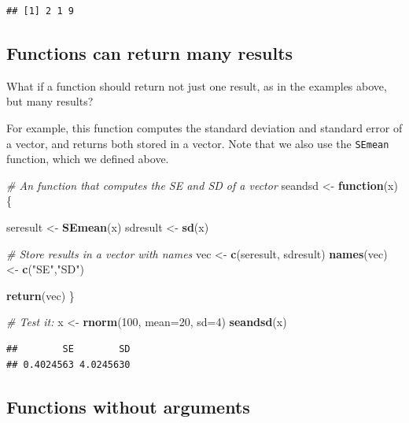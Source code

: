 \documentclass[]{book}
\newenvironment{Shaded}{\begin{snugshade}}{\end{snugshade}}
\newcommand{\CommentTok}[1]{\textcolor[rgb]{0.56,0.35,0.01}{\textit{#1}}}
\newcommand{\ControlFlowTok}[1]{\textcolor[rgb]{0.13,0.29,0.53}{\textbf{#1}}}
\newcommand{\DataTypeTok}[1]{\textcolor[rgb]{0.13,0.29,0.53}{#1}}
\newcommand{\DecValTok}[1]{\textcolor[rgb]{0.00,0.00,0.81}{#1}}
\newcommand{\KeywordTok}[1]{\textcolor[rgb]{0.13,0.29,0.53}{\textbf{#1}}}
\newcommand{\NormalTok}[1]{#1}
\newcommand{\StringTok}[1]{\textcolor[rgb]{0.31,0.60,0.02}{#1}}
\begin{document}
\begin{verbatim}
## [1] 2 1 9
\end{verbatim}

\hypertarget{functions-can-return-many-results}{%
\subsection{Functions can return many results}\label{functions-can-return-many-results}}

What if a function should return not just one result, as in the examples above, but many results?

For example, this function computes the standard deviation and standard error of a vector, and returns both stored in a vector. Note that we also use the \texttt{SEmean} function, which we defined above.

\begin{Shaded}
\begin{Highlighting}[]
\CommentTok{# An function that computes the SE and SD of a vector}
\NormalTok{seandsd <-}\StringTok{ }\ControlFlowTok{function}\NormalTok{(x)\{}
  
\NormalTok{  seresult <-}\StringTok{ }\KeywordTok{SEmean}\NormalTok{(x)}
\NormalTok{  sdresult <-}\StringTok{ }\KeywordTok{sd}\NormalTok{(x)}

  \CommentTok{# Store results in a vector with names}
\NormalTok{  vec <-}\StringTok{ }\KeywordTok{c}\NormalTok{(seresult, sdresult)}
  \KeywordTok{names}\NormalTok{(vec) <-}\StringTok{ }\KeywordTok{c}\NormalTok{(}\StringTok{"SE"}\NormalTok{,}\StringTok{"SD"}\NormalTok{)}

\KeywordTok{return}\NormalTok{(vec)}
\NormalTok{\}}

\CommentTok{# Test it:}
\NormalTok{x <-}\StringTok{ }\KeywordTok{rnorm}\NormalTok{(}\DecValTok{100}\NormalTok{, }\DataTypeTok{mean=}\DecValTok{20}\NormalTok{, }\DataTypeTok{sd=}\DecValTok{4}\NormalTok{)}
\KeywordTok{seandsd}\NormalTok{(x)}
\end{Highlighting}
\end{Shaded}

\begin{verbatim}
##        SE        SD 
## 0.4024563 4.0245630
\end{verbatim}

\hypertarget{functions-without-arguments}{%
\subsection{Functions without arguments}\label{functions-without-arguments}}
\end{document}
